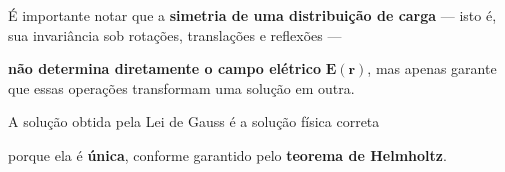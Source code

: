 \documentclass[aspectratio=169,11pt]{beamer}
\begin{document}
\begin{frame}[plain]


\vspace{1.8cm}

\begin{center}

\begin{tcolorbox}[
    colback=white,
    colframe=myred,
    width=0.9\textwidth,
    boxrule=1pt,
    arc=2mm,
    left=6pt,right=6pt,top=6pt,bottom=6pt
]

\large
É importante notar que a \textbf{simetria de uma distribuição de carga} — isto é, sua invariância sob rotações, translações e reflexões — 

\medskip

\textbf{não determina diretamente o campo elétrico} \(\mathbf{E}(\mathbf r)\), mas apenas garante que essas operações transformam uma solução em outra.

\medskip

\alert{A solução obtida pela Lei de Gauss é a solução física correta}

\medskip

porque ela é \textbf{única}, conforme garantido pelo \textbf{teorema de Helmholtz}.

\end{tcolorbox}

\end{center}

\end{frame}
\end{document}

